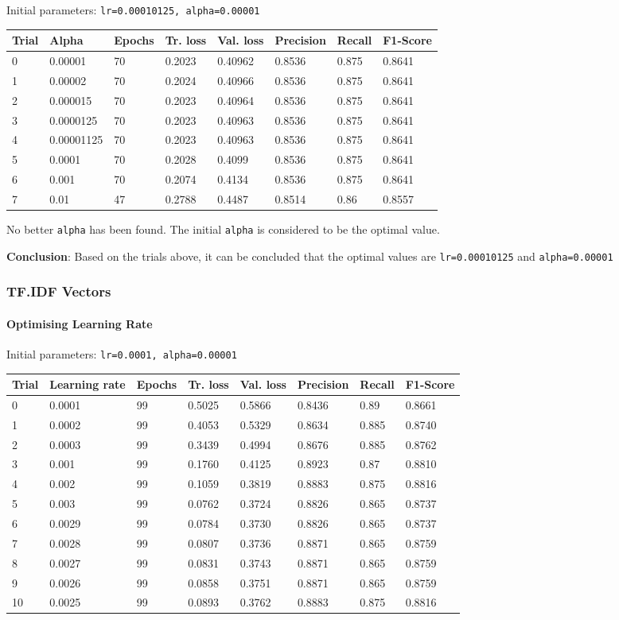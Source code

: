 \documentclass[11pt]{article}
\begin{document}
Initial parameters: \texttt{lr=0.00010125,\ alpha=0.00001}

\begin{longtable}[]{@{}llllllll@{}}
\toprule
Trial & Alpha & Epochs & Tr. loss & Val. loss & Precision & Recall &
F1-Score\tabularnewline
\midrule
\endhead
0 & 0.00001 & 70 & 0.2023 & 0.40962 & 0.8536 & 0.875 &
0.8641\tabularnewline
1 & 0.00002 & 70 & 0.2024 & 0.40966 & 0.8536 & 0.875 &
0.8641\tabularnewline
2 & 0.000015 & 70 & 0.2023 & 0.40964 & 0.8536 & 0.875 &
0.8641\tabularnewline
3 & 0.0000125 & 70 & 0.2023 & 0.40963 & 0.8536 & 0.875 &
0.8641\tabularnewline
4 & 0.00001125 & 70 & 0.2023 & 0.40963 & 0.8536 & 0.875 &
0.8641\tabularnewline
5 & 0.0001 & 70 & 0.2028 & 0.4099 & 0.8536 & 0.875 &
0.8641\tabularnewline
6 & 0.001 & 70 & 0.2074 & 0.4134 & 0.8536 & 0.875 &
0.8641\tabularnewline
7 & 0.01 & 47 & 0.2788 & 0.4487 & 0.8514 & 0.86 & 0.8557\tabularnewline
\bottomrule
\end{longtable}

No better \texttt{alpha} has been found. The initial \texttt{alpha} is
considered to be the optimal value.

\textbf{Conclusion}: Based on the trials above, it can be concluded that
the optimal values are \texttt{lr=0.00010125} and \texttt{alpha=0.00001}

\hypertarget{tf.idf-vectors}{%
\subsubsection{TF.IDF Vectors}\label{tf.idf-vectors}}

\hypertarget{optimising-learning-rate-1}{%
\paragraph{Optimising Learning Rate}\label{optimising-learning-rate-1}}

Initial parameters: \texttt{lr=0.0001,\ alpha=0.00001}

\begin{longtable}[]{@{}llllllll@{}}
\toprule
Trial & Learning rate & Epochs & Tr. loss & Val. loss & Precision &
Recall & F1-Score\tabularnewline
\midrule
\endhead
0 & 0.0001 & 99 & 0.5025 & 0.5866 & 0.8436 & 0.89 &
0.8661\tabularnewline
1 & 0.0002 & 99 & 0.4053 & 0.5329 & 0.8634 & 0.885 &
0.8740\tabularnewline
2 & 0.0003 & 99 & 0.3439 & 0.4994 & 0.8676 & 0.885 &
0.8762\tabularnewline
3 & 0.001 & 99 & 0.1760 & 0.4125 & 0.8923 & 0.87 & 0.8810\tabularnewline
4 & 0.002 & 99 & 0.1059 & 0.3819 & 0.8883 & 0.875 &
0.8816\tabularnewline
5 & 0.003 & 99 & 0.0762 & 0.3724 & 0.8826 & 0.865 &
0.8737\tabularnewline
6 & 0.0029 & 99 & 0.0784 & 0.3730 & 0.8826 & 0.865 &
0.8737\tabularnewline
7 & 0.0028 & 99 & 0.0807 & 0.3736 & 0.8871 & 0.865 &
0.8759\tabularnewline
8 & 0.0027 & 99 & 0.0831 & 0.3743 & 0.8871 & 0.865 &
0.8759\tabularnewline
9 & 0.0026 & 99 & 0.0858 & 0.3751 & 0.8871 & 0.865 &
0.8759\tabularnewline
10 & 0.0025 & 99 & 0.0893 & 0.3762 & 0.8883 & 0.875 &
0.8816\tabularnewline
\bottomrule
\end{longtable}
\end{document}
